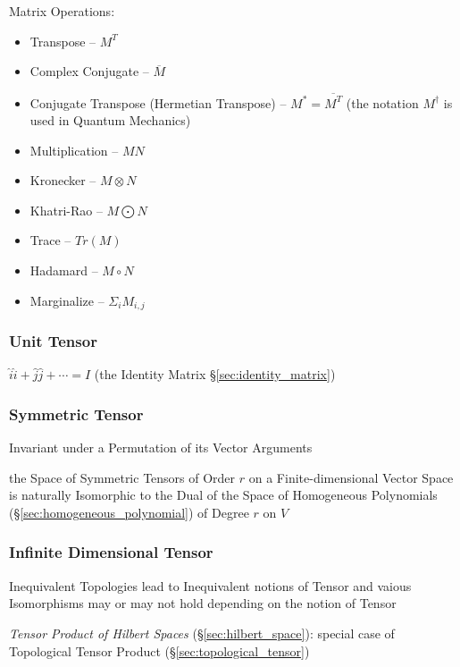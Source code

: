 {{Matrix Operations:
\begin{itemize}
\item Transpose -- $M^T$
\item Complex Conjugate -- $\overline{M}$
\item Conjugate Transpose (Hermetian Transpose) -- $M^* = \overline{M^T}$
  (the notation $M^\dag$ is used in Quantum Mechanics)
\item Multiplication -- $MN$
\item Kronecker -- $M \otimes N$
\item Khatri-Rao -- $M \bigodot N$
\item Trace -- $Tr(M)$
\item Hadamard -- $M \circ N$
\item Marginalize -- $\Sigma_i M_{i,j}$
\end{itemize}



\subsubsection{Unit Tensor}\label{sec:unit_tensor}

$\hat{i}\hat{i} + \hat{j}\hat{j} + \cdots = I$ (the Identity Matrix
\S\ref{sec:identity_matrix})



\subsubsection{Symmetric Tensor}\label{sec:symmetric_tensor}

Invariant under a Permutation of its Vector Arguments

the Space of Symmetric Tensors of Order $r$ on a Finite-dimensional Vector
Space is naturally Isomorphic to the Dual of the Space of Homogeneous
Polynomials (\S\ref{sec:homogeneous_polynomial}) of Degree $r$ on $V$



\subsubsection{Infinite Dimensional Tensor}
\label{sec:infinite_dimensional_tensor}

Inequivalent Topologies lead to Inequivalent notions of Tensor and
vaious Isomorphisms may or may not hold depending on the notion of
Tensor

\emph{Tensor Product of Hilbert Spaces} (\S\ref{sec:hilbert_space}):
special case of Topological Tensor Product
(\S\ref{sec:topological_tensor})



}}
